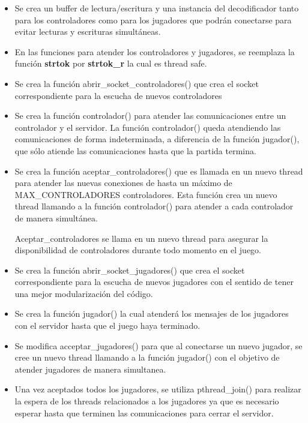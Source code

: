 \documentclass[a4paper,10pt,twoside]{article}
\begin{document}
\begin{itemize}
    \item Se crea un buffer de lectura/escritura y una instancia del decodificador tanto para los controladores como para los jugadores que podrán conectarse para evitar lecturas y escrituras simultáneas.

    \item En las funciones para atender los controladores y jugadores, se reemplaza la función \textbf{strtok} por \textbf{strtok\_r} la cual es thread safe.

    \item Se crea la función abrir\_socket\_controladores() que crea el socket correspondiente para la escucha de nuevos controladores
    
    \item Se crea la función controlador() para atender las comunicaciones entre un controlador y el servidor. La función controlador() queda atendiendo las comunicaciones de forma indeterminada, a diferencia de la función jugador(), que sólo atiende las comunicaciones hasta que la partida termina.
    
    \item Se crea la función aceptar\_controladores() que es llamada en un nuevo thread para atender las nuevas conexiones de hasta un máximo de MAX\_CONTROLADORES controladores. Esta función crea un nuevo thread llamando a la función controlador() para atender a cada controlador de manera simultánea.

    Aceptar\_controladores  se llama en un nuevo thread para asegurar la disponibilidad de controladores durante todo momento en el juego.
    
    \item Se crea la función abrir\_socket\_jugadores() que crea el socket correspondiente para la escucha de nuevos jugadores con el sentido de tener una mejor modularización del código.
    
    \item Se crea la función jugador() la cual atenderá los mensajes de los jugadores con el servidor hasta que el juego haya terminado.
    
    \item Se modifica acceptar\_jugadores() para que al conectarse un nuevo jugador, se cree un nuevo thread llamando a la función jugador() con el objetivo de atender jugadores de manera simultanea.
    
    \item Una vez aceptados todos los jugadores, se utiliza pthread\_join() para realizar la espera de los threads relacionados a los jugadores ya que es necesario esperar hasta que terminen las comunicaciones para cerrar el servidor.
    

\end{itemize}
\end{document}
